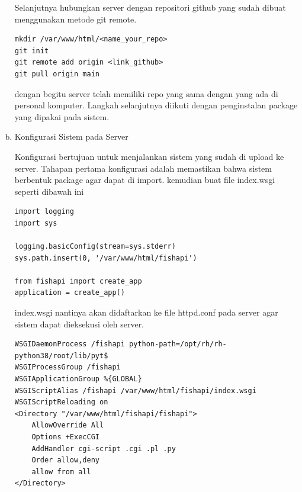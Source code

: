 \begin{enumerate}[a).]
	Selanjutnya hubungkan server dengan repositori github yang sudah dibuat menggunakan metode git remote. 
\begin{lstlisting}
mkdir /var/www/html/<name_your_repo>
git init
git remote add origin <link_github>
git pull origin main
\end{lstlisting}
dengan begitu server telah memiliki repo yang sama dengan yang ada di personal komputer. Langkah selanjutnya diikuti dengan penginstalan package yang dipakai pada sistem.

	\item{Konfigurasi Sistem pada Server}

	Konfigurasi bertujuan untuk menjalankan sistem yang sudah di upload ke server. Tahapan pertama konfigurasi adalah memastikan bahwa sistem berbentuk package agar dapat di import. kemudian buat file index.wsgi seperti dibawah ini
\begin{lstlisting}
import logging
import sys

logging.basicConfig(stream=sys.stderr)
sys.path.insert(0, '/var/www/html/fishapi')

from fishapi import create_app
application = create_app()
\end{lstlisting}
	index.wsgi nantinya akan didaftarkan ke file httpd.conf pada server agar sistem dapat dieksekusi oleh server.
\begin{lstlisting}
WSGIDaemonProcess /fishapi python-path=/opt/rh/rh-python38/root/lib/pyt$
WSGIProcessGroup /fishapi
WSGIApplicationGroup %{GLOBAL}
WSGIScriptAlias /fishapi /var/www/html/fishapi/index.wsgi
WSGIScriptReloading on
<Directory "/var/www/html/fishapi/fishapi">
	AllowOverride All
	Options +ExecCGI
	AddHandler cgi-script .cgi .pl .py
	Order allow,deny
	allow from all
</Directory>


\end{lstlisting}
\end{enumerate}
